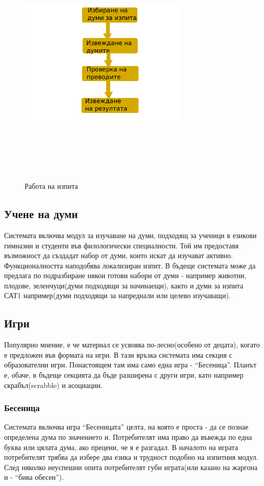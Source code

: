 \begin{figure}[htbp]
  \caption{Работа на изпита}
  \centering
  \includegraphics[width=80mm, height=120mm]{images/exam_flow.png}
\end{figure}

\subsection{Учене на думи}
Системата включва модул за изучаване на думи, подходящ за ученици в
езикови гимназии и студенти във филологически специалности. Той им
предоставя възможност да създадат набор от думи, които искат да
изучават активно. Функционалността наподобява локализиран изпит. В
бъдеще системата може да предлага по подразбиране някои готови набори
от думи - например животни, плодове, зеленчуци(думи подходящи за
начинаещи), както и думи за изпита САТ1 например(думи подходящи за
напреднали или целево изучаващи).
\subsection{Игри}
Популярно мнение, е че материал се усвоява по-лесно(особено от
децата), когато е предложен във формата на игри. В тази връзка
системата има секция с образователни игри. Понастоящем там има само
една игра - "`Бесеница"'. Планът е, обаче, в бъдеще секцията да бъде
разширена с други игри, като например скрабъл(scrabble) и асоциации.
\subsubsection{Бесеница}
Системата включва игра "`Бесеницата"' целта, на която е проста - да се
познае определена дума по значението и. Потребителят има право да
въвежда по една буква или цялата дума, ако прецени, че я е разгадал. В
началото на играта потребителят трябва да избере два езика и трудност
подобно на изпитния модул. След няколко неуспешни опита потребителят
губи играта(или казано на жаргона и - "`бива обесен"'). 
